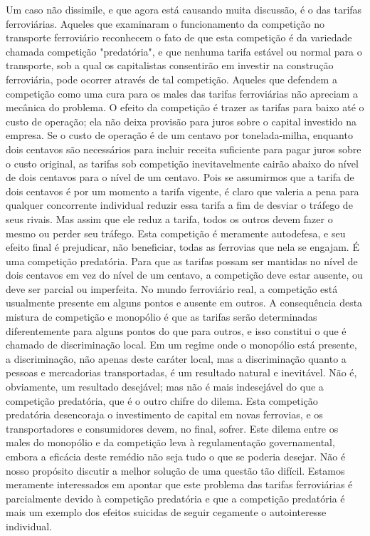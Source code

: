 \documentclass[12pt]{article}
\begin{document}
Um caso não dissimile, e que agora está causando muita discussão, é o das tarifas ferroviárias. Aqueles que examinaram o funcionamento da competição no transporte ferroviário reconhecem o fato de que esta competição é da variedade chamada competição "predatória", e que nenhuma tarifa estável ou normal para o transporte, sob a qual os capitalistas consentirão em investir na construção ferroviária, pode ocorrer através de tal competição. Aqueles que defendem a competição como uma cura para os males das tarifas ferroviárias não apreciam a mecânica do problema. O efeito da competição é trazer as tarifas para baixo até o custo de operação; ela não deixa provisão para juros sobre o capital investido na empresa. Se o custo de operação é de um centavo por tonelada-milha, enquanto dois centavos são necessários para incluir receita suficiente para pagar juros sobre o custo original, as tarifas sob competição inevitavelmente cairão abaixo do nível de dois centavos para o nível de um centavo. Pois se assumirmos que a tarifa de dois centavos é por um momento a tarifa vigente, é claro que valeria a pena para qualquer concorrente individual reduzir essa tarifa a fim de desviar o tráfego de seus rivais. Mas assim que ele reduz a tarifa, todos os outros devem fazer o mesmo ou perder seu tráfego. Esta competição é meramente autodefesa, e seu efeito final é prejudicar, não beneficiar, todas as ferrovias que nela se engajam. É uma competição predatória. Para que as tarifas possam ser mantidas no nível de dois centavos em vez do nível de um centavo, a competição deve estar ausente, ou deve ser parcial ou imperfeita. No mundo ferroviário real, a competição está usualmente presente em alguns pontos e ausente em outros. A consequência desta mistura de competição e monopólio é que as tarifas serão determinadas diferentemente para alguns pontos do que para outros, e isso constitui o que é chamado de discriminação local. Em um regime onde o monopólio está presente, a discriminação, não apenas deste caráter local, mas a discriminação quanto a pessoas e mercadorias transportadas, é um resultado natural e inevitável. Não é, obviamente, um resultado desejável; mas não é mais indesejável do que a competição predatória, que é o outro chifre do dilema. Esta competição predatória desencoraja o investimento de capital em novas ferrovias, e os transportadores e consumidores devem, no final, sofrer. Este dilema entre os males do monopólio e da competição leva à regulamentação governamental, embora a eficácia deste remédio não seja tudo o que se poderia desejar. Não é nosso propósito discutir a melhor solução de uma questão tão difícil. Estamos meramente interessados em apontar que este problema das tarifas ferroviárias é parcialmente devido à competição predatória e que a competição predatória é mais um exemplo dos efeitos suicidas de seguir cegamente o autointeresse individual.
\end{document}

